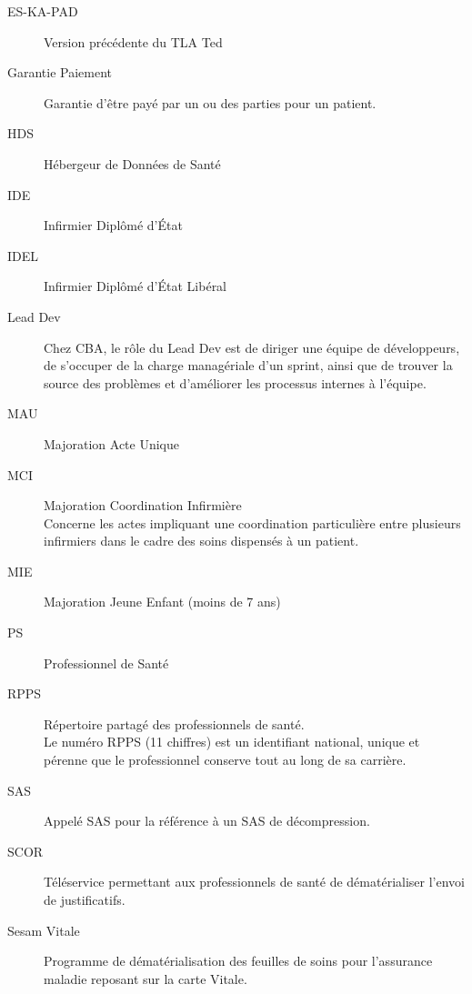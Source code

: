 \documentclass{article}
\begin{document}
\begin{description}
    \item[ES-KA-PAD\label{term:es-ka-pad}] Version précédente du TLA Ted

    \item[Garantie Paiement\label{term:gp}] Garantie d'être payé par un ou des parties pour un patient.

    \item[HDS\label{term:hds}] Hébergeur de Données de Santé

    \item[IDE\label{term:ide}] Infirmier Diplômé d'État

    \item[IDEL\label{term:idel}] Infirmier Diplômé d'État Libéral

    \item[Lead Dev\label{term:leaddev}] Chez CBA, le rôle du Lead Dev est de diriger une équipe de développeurs, de s'occuper de la charge managériale d'un sprint, ainsi que de trouver la source des problèmes et d'améliorer les processus internes à l'équipe.

    \item[MAU\label{term:mau}] Majoration Acte Unique

    \item[MCI\label{term:mci}] Majoration Coordination Infirmière \\ 
    Concerne les actes impliquant une coordination particulière entre plusieurs infirmiers dans le cadre des soins dispensés à un patient.

    \item[MIE\label{term:mie}] Majoration Jeune Enfant (moins de 7 ans)

    \item[PS\label{term:ps}] Professionnel de Santé

    \item[RPPS\label{term:RPPS}] Répertoire partagé des professionnels de santé. \\
    Le numéro RPPS (11 chiffres) est un identifiant national, unique et pérenne que le professionnel conserve tout au long de sa carrière.

    \item[SAS\label{term:sas}] Appelé SAS pour la référence à un SAS de décompression.
    
    \item[SCOR\label{term:scor}] Téléservice permettant aux professionnels de santé de dématérialiser l'envoi de justificatifs.

    \item[Sesam Vitale\label{term:sesam}] Programme de dématérialisation des feuilles de soins pour l'assurance maladie reposant sur la carte Vitale.


\end{description}
\end{document}
